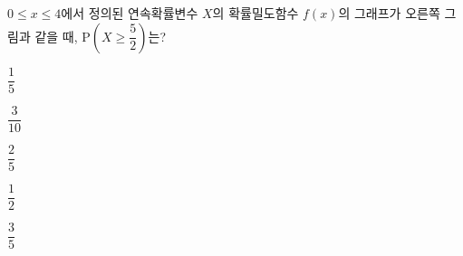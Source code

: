 \noindent\begin{minipage}[t]{0.58\linewidth}\vspace{0pt}\raggedright $0\le x\le 4$에서 정의된 연속확률변수 $X$의 확률밀도함수 $f(x)$의 그래프가 오른쪽 그림과 같을 때, $\mathrm{P}\left(X\ge\dfrac{5}{2}\right)$는? \end{minipage}\hfill\begin{minipage}[t]{0.4\linewidth}\vspace{0pt}\centering \resizebox{\ifdim\width>\linewidth\linewidth\else\width\fi}{!}{}\end{minipage}\par
\begin{choicesii}{\rule[-3ex]{0pt}{8ex}$\dfrac{1}{5}$}{\rule[-3ex]{0pt}{8ex}$\dfrac{3}{10}$}{\rule[-3ex]{0pt}{8ex}$\dfrac{2}{5}$}{\rule[-3ex]{0pt}{8ex}$\dfrac{1}{2}$}{\rule[-3ex]{0pt}{8ex}$\dfrac{3}{5}$}\end{choicesii}
